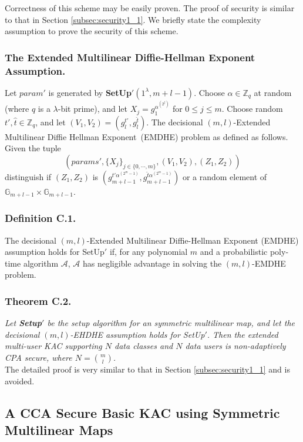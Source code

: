 \noindent Correctness of this scheme may be easily proven. The proof of security is similar to that in Section \ref{subsec:security1_1}. We briefly state the complexity assumption to prove the security of this scheme.

\subsubsection{The Extended Multilinear Diffie-Hellman Exponent Assumption.} Let $param'$ is generated by \textbf{SetUp}$'(1^{\lambda},m+l-1)$. Choose $\alpha \in \mathbb{Z}_q$ at random (where $q$ is a $\lambda$-bit prime), and let $X_j=g^{\alpha^{(2^j)}}_{1}$ for $0\leq j \leq m$. Choose random $t',\hat{t}\in\mathbb{Z}_q$, and let $(V_1,V_2)=\left(g^{t'}_{l},g^{\hat{t}}_{l}\right)$. The decisional $(m,l)$-Extended Multilinear Diffie Hellman Exponent~(EMDHE) problem as defined as follows. Given the tuple 
\begin{equation}
\left(params',\{X_j\}_{j\in\{0,\cdots,m\}},(V_1,V_2),(Z_1,Z_2)\right)\nonumber
\end{equation}
\noindent distinguish if $(Z_1,Z_2)$ is $\left(g^{t'\alpha^{(2^m-1)}}_{m+l-1},g^{\hat{t}\alpha^{(2^m-1)}}_{m+l-1}\right)$ or a random element of $\mathbb{G}_{m+l-1}\times\mathbb{G}_{m+l-1}$.

\subsubsection{Definition C.1.} The decisional $(m,l)$-Extended Multilinear Diffie-Hellman Exponent (EMDHE) assumption holds for {SetUp}$'$ if, for any polynomial $m$ and a probabilistic poly-time algorithm $\mathcal{A}$, $\mathcal{A}$ has negligible advantage in solving the $(m,l)$-EMDHE problem.

\subsubsection{Theorem C.2.} \textit{Let \textbf{Setup}$'$ be the setup algorithm for an symmetric multilinear map, and let the decisional $(m,l)$-EHDHE assumption holds for {SetUp}$'$. Then the extended multi-user KAC supporting $N$ data classes and $N$ data users is non-adaptively CPA secure, where $N=\binom{m}{l}$.}\\

The detailed proof is very similar to that in Section \ref{subsec:security1_1} and is avoided.


\subsection{A CCA Secure Basic KAC using Symmetric Multilinear Maps}
\label{app_sec:CCAsecure2}

